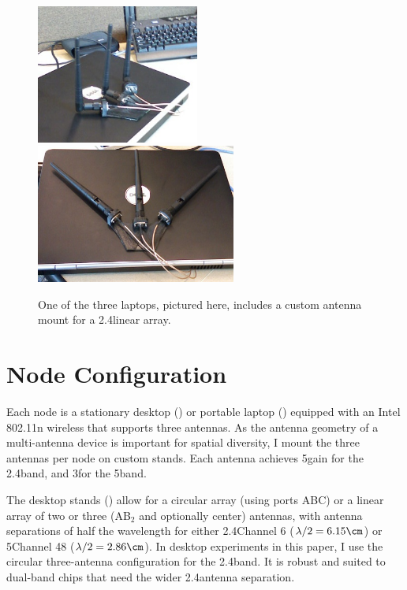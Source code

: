 \begin{figure}[ht]
	\centering
	\includegraphics[height=1.8in]{figures/laptop_stand_cropped_up.jpg}%
	\hspace{0.6in}%
	\includegraphics[height=1.8in]{figures/laptop_stand_cropped.jpg}
	\caption[A custom laptop antenna stand]{\label{fig:laptop_stands}One of the three laptops, pictured here, includes a custom antenna mount for a 2.4\GHz linear array.}
\end{figure}

\section{Node Configuration}
Each node is a stationary desktop () or portable laptop () equipped with an Intel 802.11n wireless  that supports three antennas. As the antenna geometry of a multi-antenna device is important for spatial diversity, I mount the three antennas per node on custom stands. Each antenna achieves 5\dBi gain for the 2.4\GHz band, and 3\dBi for the 5\GHz band.

The desktop stands () allow for a circular array (using ports ABC) or a linear array of two or three (AB$_2$ and optionally center) antennas, with antenna separations of half the wavelength for either 2.4\GHz Channel 6 ($\lambda/2 = 6.15\cm$) or 5\GHz Channel 48 ($\lambda/2=2.86\cm$). In desktop experiments in this paper, I use the circular three-antenna configuration for the 2.4\GHz band. It is robust and suited to dual-band chips that need the wider 2.4\GHz antenna separation. 

